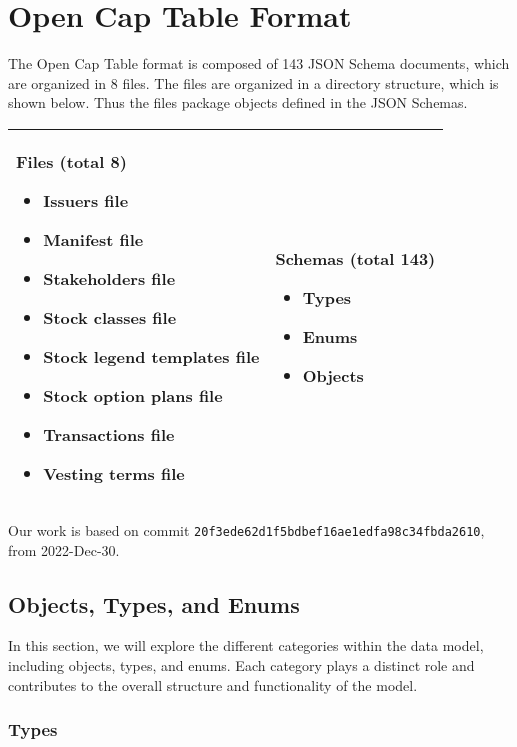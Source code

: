 \chapter{Open Cap Table Format}

The Open Cap Table format is composed of 143 JSON Schema documents, which are organized in 8 files.  The files are organized in a directory structure, which is shown below. Thus the files package objects defined in the JSON Schemas.

\begin{tabular}{|p{6cm}|p{6cm}|}
    \hline
    \textbf{Files (total 8)}
    \begin{itemize}
    \item Issuers file
    \item Manifest file
    \item Stakeholders file
    \item Stock classes file
    \item Stock legend templates file
    \item Stock option plans file
    \item Transactions file
    \item Vesting terms file
    \end{itemize}
      &   
    \textbf{Schemas (total 143)}
    \begin{itemize}
    \item Types
    \item Enums
    \item Objects
    \end{itemize} \\
    \hline
\end{tabular}

\noindent Our work is based on commit \verb|20f3ede62d1f5bdbef16ae1edfa98c34fbda2610|, from 2022-Dec-30.

\section{Objects, Types, and Enums}

In this section, we will explore the different categories within the data model, including objects, types, and enums. Each category plays a distinct role and contributes to the overall structure and functionality of the model.

\subsection{Types}


